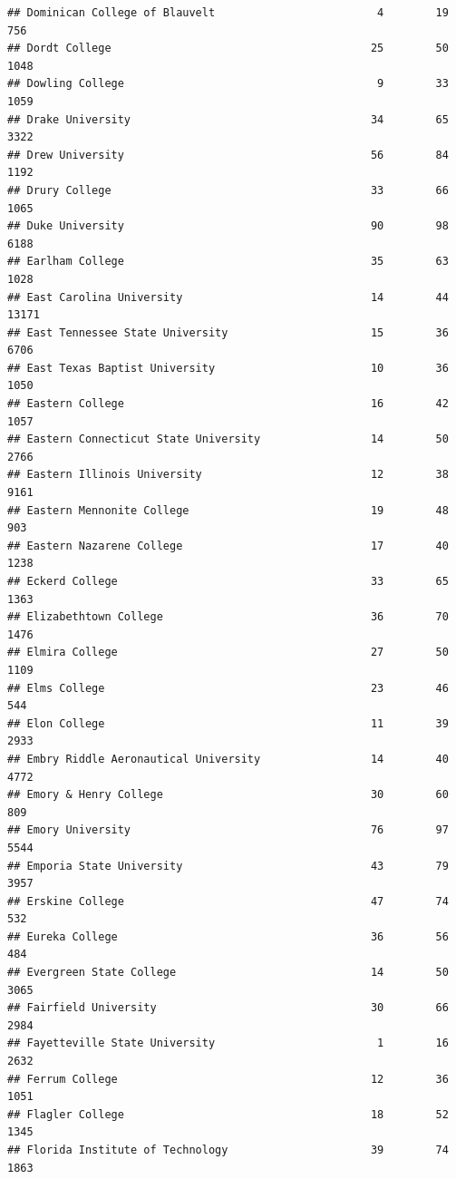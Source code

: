 \documentclass[
]{article}
\begin{document}
\begin{verbatim}
## Dominican College of Blauvelt                         4        19         756
## Dordt College                                        25        50        1048
## Dowling College                                       9        33        1059
## Drake University                                     34        65        3322
## Drew University                                      56        84        1192
## Drury College                                        33        66        1065
## Duke University                                      90        98        6188
## Earlham College                                      35        63        1028
## East Carolina University                             14        44       13171
## East Tennessee State University                      15        36        6706
## East Texas Baptist University                        10        36        1050
## Eastern College                                      16        42        1057
## Eastern Connecticut State University                 14        50        2766
## Eastern Illinois University                          12        38        9161
## Eastern Mennonite College                            19        48         903
## Eastern Nazarene College                             17        40        1238
## Eckerd College                                       33        65        1363
## Elizabethtown College                                36        70        1476
## Elmira College                                       27        50        1109
## Elms College                                         23        46         544
## Elon College                                         11        39        2933
## Embry Riddle Aeronautical University                 14        40        4772
## Emory & Henry College                                30        60         809
## Emory University                                     76        97        5544
## Emporia State University                             43        79        3957
## Erskine College                                      47        74         532
## Eureka College                                       36        56         484
## Evergreen State College                              14        50        3065
## Fairfield University                                 30        66        2984
## Fayetteville State University                         1        16        2632
## Ferrum College                                       12        36        1051
## Flagler College                                      18        52        1345
## Florida Institute of Technology                      39        74        1863

\end{verbatim}
\end{document}
